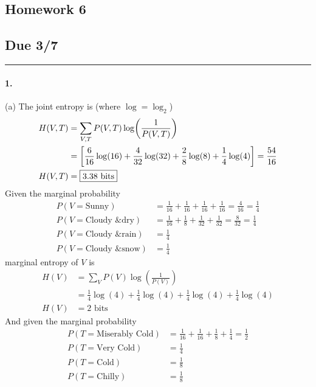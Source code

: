 \documentclass[../main.tex]{subfiles}
\begin{document}
\setcounter{section}{6}
\begin{center}
    \section*{Homework 6}
    \subsection*{Due 3/7}
\end{center}
\hrule \vspace{10px}

\paragraph*{1.} (a) The joint entropy is (where $\log = \log_2$)
\begin{align*}
    H(V,T) &= \sum_{V,T} P(V,T) \log(\frac{1}{P(V,T)}) \\
    &= \qt[\frac{6}{16}\log(16) + \frac{4}{32}\log(32) 
        + \frac{2}{8}\log(8) + \frac{1}{4} \log(4)] = \frac{54}{16} \\
    H(V,T) &= \boxed{3.38 \text{ bits}}
\end{align*}
Given the marginal probability 
\begin{align*}
    P(V=\text{Sunny}) &= \frac{1}{16} + \frac{1}{16} + \frac{1}{16} + \frac{1}{16} = \frac{4}{16} = \frac{1}{4} \\
    P(V=\text{Cloudy \& dry}) &= \frac{1}{16} + \frac{1}{8} + \frac{1}{32} + \frac{1}{32} = \frac{8}{32} = \frac{1}{4} \\
    P(V=\text{Cloudy \& rain}) &= \frac{1}{4} \\
    P(V=\text{Cloudy \& snow}) &= \frac{1}{4}
\end{align*}
marginal entropy of $V$ is
\begin{align*}
    H(V) &= \sum_V P(V) \log(\frac{1}{P(V)}) \\
    &= \frac{1}{4}\log(4) + \frac{1}{4}\log(4) + \frac{1}{4}\log(4) + \frac{1}{4}\log(4) \\
    H(V) &= \boxed{2 \text{ bits}}
\end{align*}
And given the marginal probability 
\begin{align*}
    P(T=\text{Miserably Cold}) &= \frac{1}{16} + \frac{1}{16} + \frac{1}{8} + \frac{1}{4} = \frac{1}{2} \\
    P(T=\text{Very Cold}) &= \frac{1}{4} \\
    P(T=\text{Cold}) &= \frac{1}{8} \\
    P(T=\text{Chilly}) &= \frac{1}{8}
\end{align*}
\end{document}
